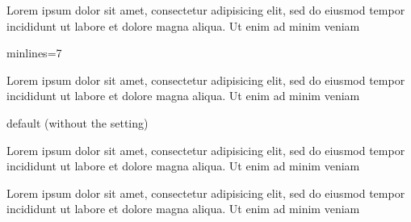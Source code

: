\documentclass{article}
\begin{document}
Lorem ipsum dolor sit amet, consectetur adipisicing elit, sed do eiusmod
tempor incididunt ut labore et dolore magna aliqua. Ut enim ad minim
veniam

\begin{clozepar}[minlines=7]
minlines=7
\end{clozepar}

Lorem ipsum dolor sit amet, consectetur adipisicing elit, sed do eiusmod
tempor incididunt ut labore et dolore magna aliqua. Ut enim ad minim
veniam

\begin{clozepar}
default (without the setting)
\end{clozepar}

Lorem ipsum dolor sit amet, consectetur adipisicing elit, sed do eiusmod
tempor incididunt ut labore et dolore magna aliqua. Ut enim ad minim
veniam

\begin{clozepar}[minlines=7]
Lorem ipsum dolor sit amet, consectetur adipisicing elit, sed do eiusmod
tempor incididunt ut labore et dolore magna aliqua. Ut enim ad minim
veniam
\end{clozepar}
\end{document}
